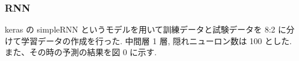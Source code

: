 

\subsubsection{RNN}
keras の simpleRNN というモデルを用いて訓練データと試験データを 8:2 に分けて学習データの作成を行った. 中間層 1 層, 隠れニューロン数は 100 とした. また、その時の予測の結果を図 0 に示す.



